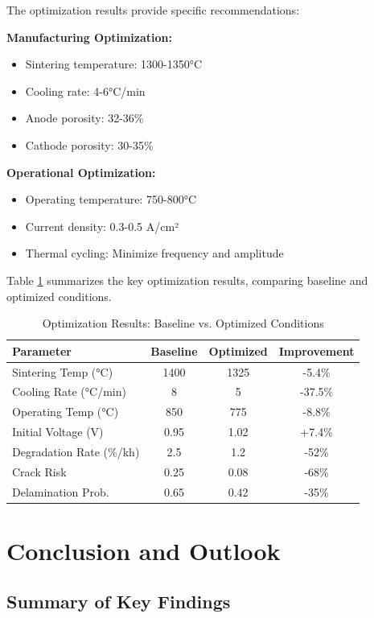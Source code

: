 \documentclass[conference]{IEEEtran}
\begin{document}
The optimization results provide specific recommendations:

\textbf{Manufacturing Optimization:}
\begin{itemize}
\item Sintering temperature: 1300-1350°C
\item Cooling rate: 4-6°C/min
\item Anode porosity: 32-36\%
\item Cathode porosity: 30-35\%
\end{itemize}

\textbf{Operational Optimization:}
\begin{itemize}
\item Operating temperature: 750-800°C
\item Current density: 0.3-0.5 A/cm²
\item Thermal cycling: Minimize frequency and amplitude
\end{itemize}

Table \ref{tab:optimization_results} summarizes the key optimization results, comparing baseline and optimized conditions.

\begin{table}[htbp]
\caption{Optimization Results: Baseline vs. Optimized Conditions}
\label{tab:optimization_results}
\centering
\begin{tabular}{lccc}
\toprule
\textbf{Parameter} & \textbf{Baseline} & \textbf{Optimized} & \textbf{Improvement} \\
\midrule
Sintering Temp (°C) & 1400 & 1325 & -5.4\% \\
Cooling Rate (°C/min) & 8 & 5 & -37.5\% \\
Operating Temp (°C) & 850 & 775 & -8.8\% \\
Initial Voltage (V) & 0.95 & 1.02 & +7.4\% \\
Degradation Rate (\%/kh) & 2.5 & 1.2 & -52\% \\
Crack Risk & 0.25 & 0.08 & -68\% \\
Delamination Prob. & 0.65 & 0.42 & -35\% \\
\bottomrule
\end{tabular}
\end{table}

\section{Conclusion and Outlook}

\subsection{Summary of Key Findings}
\end{document}
